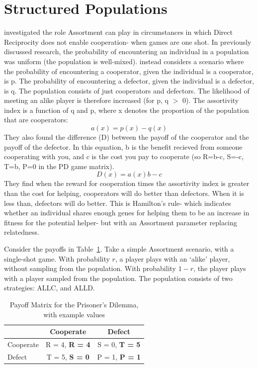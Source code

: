 \documentclass[a4paper,11pt,bcshonoursthesis,singlespace,twoside]{cssethesis}
\begin{document}
\section{Structured Populations}
\label{sec:ass}
\citet{bergstrom2003algebra} investigated the role Assortment can play in circumstances in which Direct Reciprocity does not enable cooperation- when games are one shot. 
In previously discussed research, the probability of encountering an individual in a population was uniform (the population is well-mixed). 
\citet{bergstrom2003algebra} instead considers a scenario where the probability of encountering a cooperator, given the individual is a cooperator, is p. The probability of encountering a defector, given the individual is a defector, is q. 
The population consists of just cooperators and defectors. The likelihood of meeting an alike player is therefore increased (for p, q $>$ 0). The assortivity index is a function of q and p, where x denotes the proportion of the population that are cooperators:
\begin{equation*}
a(x)=p(x)-q(x)
\end{equation*}
They also found the difference (D) between the payoff of the cooperator and the payoff of the defector. 
In this equation, b is the benefit recieved from someone cooperating with you, and c is the cost you pay to cooperate (so R=b-c, S=-c, T=b, P=0 in the PD game matrix).
\begin{equation}
D(x)=a(x)b-c
\end{equation}
They find when the reward for cooperation times the assortivity index is greater than the cost for helping, cooperators will do better than defectors. When it is less than, defectors will do better. 
This is Hamilton's rule- which indicates whether an individual shares enough genes for helping them to be an increase in fitness for the potential helper- but with an Assortment parameter replacing relatedness. 

Consider the payoffs in Table~\ref{table:payoffs2}. 
Take a simple Assortment scenario, with a single-shot game. 
With probability $r$, a player plays with an `alike' player, without sampling from the population. 
With probability $1-r$, the player plays with a player sampled from the population. 
The population consists of two strategies: ALLC, and ALLD.

\begin{table}[h]\centering
\captionsetup{justification=centering}
\begin{tabular}{|l|c|c|}
\hline
 & \bf{Cooperate} & \bf{Defect}\\
\hline
Cooperate & R = 4, \bf{R = 4} & S = 0, \bf{T = 5}\\
\hline
Defect & T = 5, \bf{S = 0}  & P = 1, \bf{P = 1} \\
\hline
\end{tabular}
\caption{Payoff Matrix for the Prisoner's Dilemma, with example values}
\label{table:payoffs2}
\end{table}
\end{document}
